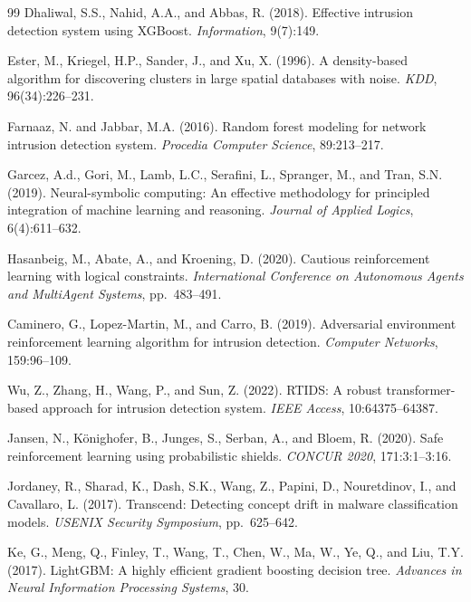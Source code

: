 \documentclass[12pt, letterpaper, oneside]{report}
\begin{document}
\begin{thebibliography}{99}
Dhaliwal, S.S., Nahid, A.A., and Abbas, R. (2018).
Effective intrusion detection system using XGBoost.
\textit{Information}, 9(7):149.

Ester, M., Kriegel, H.P., Sander, J., and Xu, X. (1996).
A density-based algorithm for discovering clusters in large spatial databases with noise.
\textit{KDD}, 96(34):226--231.

Farnaaz, N. and Jabbar, M.A. (2016).
Random forest modeling for network intrusion detection system.
\textit{Procedia Computer Science}, 89:213--217.

Garcez, A.d., Gori, M., Lamb, L.C., Serafini, L., Spranger, M., and Tran, S.N. (2019).
Neural-symbolic computing: An effective methodology for principled integration of machine learning and reasoning.
\textit{Journal of Applied Logics}, 6(4):611--632.

Hasanbeig, M., Abate, A., and Kroening, D. (2020).
Cautious reinforcement learning with logical constraints.
\textit{International Conference on Autonomous Agents and MultiAgent Systems}, pp.\ 483--491.

Caminero, G., Lopez-Martin, M., and Carro, B. (2019).
Adversarial environment reinforcement learning algorithm for intrusion detection.
\textit{Computer Networks}, 159:96--109.

Wu, Z., Zhang, H., Wang, P., and Sun, Z. (2022).
RTIDS: A robust transformer-based approach for intrusion detection system.
\textit{IEEE Access}, 10:64375--64387.

Jansen, N., K{\"o}nighofer, B., Junges, S., Serban, A., and Bloem, R. (2020).
Safe reinforcement learning using probabilistic shields.
\textit{CONCUR 2020}, 171:3:1--3:16.

Jordaney, R., Sharad, K., Dash, S.K., Wang, Z., Papini, D., Nouretdinov, I., and Cavallaro, L. (2017).
Transcend: Detecting concept drift in malware classification models.
\textit{USENIX Security Symposium}, pp.\ 625--642.

Ke, G., Meng, Q., Finley, T., Wang, T., Chen, W., Ma, W., Ye, Q., and Liu, T.Y. (2017).
LightGBM: A highly efficient gradient boosting decision tree.
\textit{Advances in Neural Information Processing Systems}, 30.


\end{thebibliography}
\end{document}
